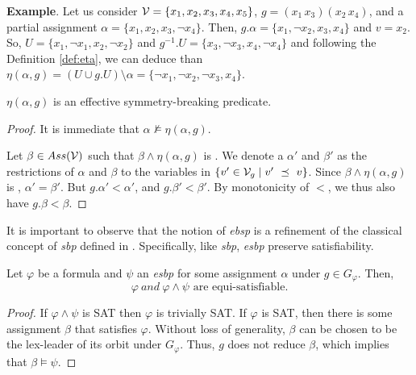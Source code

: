 \textbf{Example}. Let us consider $\mathcal{V} = \{x_1, x_2, x_3, x_4, x_5\}$, $g =
(x_1\,x_3)(x_2\,x_4)$, and a partial assignment $\alpha = \{x_1, x_2,
x_3, \neg x_4\}$. Then, $g.\alpha = \{x_1, \neg x_2, x_3, x_4\}$ and $v = x_2$.
So, $U = \{x_1, \neg x_1, x_2, \neg x_2\}$ and $g^{-1}.U = \{x_3, \neg x_3,
x_4, \neg x_4\}$ and following the Definition \ref{def:eta}, we can deduce than $\eta(\alpha, g) = (U \cup g.U)
\setminus \alpha = \{\neg x_1, \neg x_2, \neg x_3, x_4\}$.
\begin{proposition}
 \label{prop:eta}
 $\eta(\alpha, g)$ is an effective symmetry-breaking predicate.
\end{proposition}
\begin{proof}
 It is immediate that $\alpha \not\models \eta(\alpha, g)$.
 
 Let $\beta \in Ass(\mathcal{V})$ such that $\beta \wedge \eta(\alpha, g)$ is \unsat. We denote a $\alpha'$
 and $\beta'$ as the restrictions of $\alpha$ and $\beta$ to the variables in $\{ v' \in
 \mathcal{V}_g \mid v'~\preceq~v \}$. Since $\beta \wedge \eta(\alpha, g)$ is \unsat, $\alpha' = \beta'$.
 But $g.\alpha' < \alpha'$, and $g.\beta' < \beta'$. By monotonicity of $<$, we thus also have
 $g.\beta < \beta$. \end{proof}
\medskip\noindent It is important to observe that the notion of \textit{ebsp}
is a refinement of the classical concept of \textit{sbp} defined in \cite{aloul06}. Specifically, like \textit{sbp}, \textit{esbp} preserve satisfiability.

\begin{theorem}
 Let $\varphi$ be a formula and $\psi$ an \textit{esbp} for some assignment $\alpha$ under $g \in G_{\varphi}$. Then,
 $$\varphi~and ~\varphi \wedge \psi \text{ are equi-satisfiable}.$$
\end{theorem}
\begin{proof}
 
 If $\varphi \wedge \psi$ is SAT then $\varphi$ is trivially SAT. If
 $\varphi$ is SAT, then there is some assignment $\beta$ that satisfies $\varphi$.
 Without loss of generality, $\beta$ can be chosen to be the lex-leader of its
 orbit under $G_{\varphi}$. Thus, $g$ does not reduce $\beta$, which implies that
 $\beta \models \psi$.
 
\end{proof}

